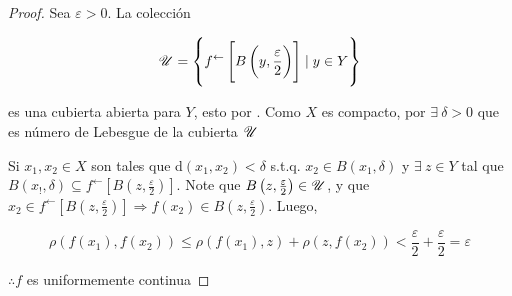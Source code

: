\begin{proof}
    Sea $\varepsilon > 0$. La colección 

    $$\mathscr{U} = \left\{ f^\leftarrow \left[B\left( y, \frac{\varepsilon}{2}\right) \right] \mid y \in Y \right\}$$

    es una cubierta abierta para $Y$, esto por . Como $X$ es compacto, por  $\exists \: \delta > 0$ que es número de Lebesgue de la cubierta $\mathscr{U}$

    Si $x_1, x_2 \in X$ son tales que d$(x_1,x_2) < \delta$ s.t.q. $x_2 \in B(x_1,\delta)$ y $\exists \: z \in Y$ tal que  $B(x_!, \delta) \subseteq f^\leftarrow \left[B\left( z, \frac{\varepsilon}{2}\right) \right]$. Note que $B\left( z, \frac{\varepsilon}{2}\right) \in \mathscr{U}$, y que $x_2 \in f^\leftarrow \left[B\left( z, \frac{\varepsilon}{2}\right) \right] \Rightarrow f(x_2) \in B\left( z, \frac{\varepsilon}{2}\right)$. Luego,

    $$\rho(f(x_1),f(x_2)) \leqslant \rho(f(x_1),z) + \rho(z,f(x_2)) < \frac{\varepsilon}{2}+ \frac{\varepsilon}{2} = \varepsilon$$

    $\therefore f$ es uniformemente continua
\end{proof}
